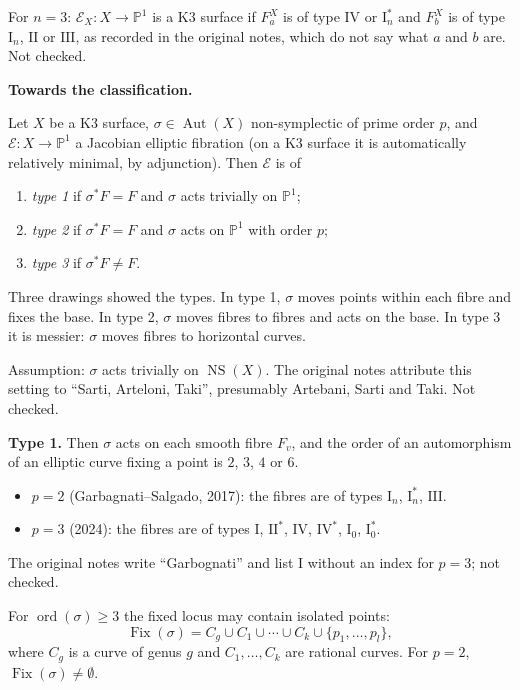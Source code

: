 For $n=3$: $\mathcal{E}_X\colon X\to
\mathbb{P}^1$ is a K3 surface if
$F^X_a$ is of type $\mathrm{IV}$ or
$\mathrm{I}^*_n$ and $F^X_b$ is of type
$\mathrm{I}_n$, $\mathrm{II}$ or
$\mathrm{III}$, as recorded in the original
notes, which do not say what $a$ and $b$
are. Not checked.

\medskip\noindent
{\bf Towards the classification.}

\begin{definition}
\label{definition-zingali-types}
Let $X$ be a K3 surface,
$\sigma\in\operatorname{Aut}(X)$
non-symplectic of prime order $p$, and
$\mathcal{E}\colon X\to\mathbb{P}^1$ a
Jacobian elliptic fibration (on a K3
surface it is automatically relatively
minimal, by adjunction). Then
$\mathcal{E}$ is of
\begin{enumerate}
\item \emph{type 1} if $\sigma^*F=F$ and
$\sigma$ acts trivially on $\mathbb{P}^1$;
\item \emph{type 2} if $\sigma^*F=F$ and
$\sigma$ acts on $\mathbb{P}^1$ with order
$p$;
\item \emph{type 3} if $\sigma^*F\neq F$.
\end{enumerate}
\end{definition}

Three drawings showed the types. In type 1,
$\sigma$ moves points within each fibre and
fixes the base. In type 2, $\sigma$ moves
fibres to fibres and acts on the base. In
type 3 it is messier: $\sigma$ moves fibres
to horizontal curves.

Assumption: $\sigma$ acts trivially on
$\operatorname{NS}(X)$. The original notes
attribute this setting to ``Sarti,
Arteloni, Taki'', presumably Artebani,
Sarti and Taki. Not checked.

\medskip\noindent
{\bf Type 1.} Then $\sigma$ acts on each
smooth fibre $F_v$, and the order of an
automorphism of an elliptic curve fixing a
point is $2$, $3$, $4$ or $6$.
\begin{itemize}
\item $p=2$ (Garbagnati--Salgado, 2017):
the fibres are of types $\mathrm{I}_n$,
$\mathrm{I}^*_n$, $\mathrm{III}$.
\item $p=3$ (2024): the fibres are of types
$\mathrm{I}$, $\mathrm{II}^*$, $\mathrm{IV}$,
$\mathrm{IV}^*$, $\mathrm{I}_0$,
$\mathrm{I}^*_0$.
\end{itemize}
The original notes write ``Garbognati'' and
list $\mathrm{I}$ without an index for
$p=3$; not checked.

For $\operatorname{ord}(\sigma)\geq 3$ the
fixed locus may contain isolated points:
$$
\operatorname{Fix}(\sigma)=
C_g\cup C_1\cup\cdots\cup C_k
\cup\{p_1,\ldots,p_l\},
$$
where $C_g$ is a curve of genus $g$ and
$C_1,\ldots,C_k$ are rational curves. For
$p=2$, $\operatorname{Fix}(\sigma)\neq
\emptyset$.

